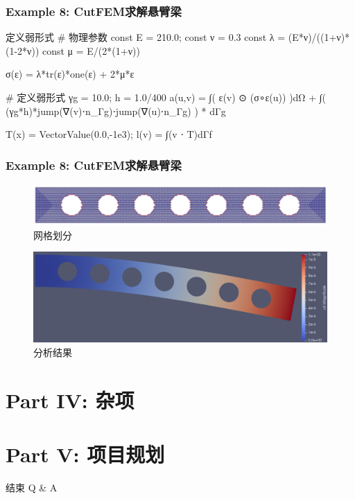 \documentclass[lang=en,aspectratio=43,theme=default,logo=on]{simplebeamer}
\begin{document}
\begin{frame}[fragile]
    \frametitle{Example 8: CutFEM求解悬臂梁}
\begin{codex}{15}{定义弱形式}
# 物理参数
const E = 210.0; const ν = 0.3
const λ = (E*ν)/((1+ν)*(1-2*ν))
const μ = E/(2*(1+ν))

σ(ε) = λ*tr(ε)*one(ε) + 2*μ*ε

# 定义弱形式
γg = 10.0; h = 1.0/400
a(u,v) = ∫( ε(v) ⊙ (σ∘ε(u)) )dΩ + ∫( (γg*h)*jump(∇(v)⋅n_Γg)⋅jump(∇(u)⋅n_Γg) ) * dΓg

T(x) = VectorValue(0.0,-1e3);
l(v) = ∫(v ⋅ T)dΓf
\end{codex}
\end{frame}

\begin{frame}[fragile]
    \frametitle{Example 8: CutFEM求解悬臂梁}
    \begin{figure}
        \centering %
        \includegraphics[width=1\textwidth]{./img/025.png}
        \caption{网格划分}
    \end{figure}
    \begin{figure}
        \centering %
        \includegraphics[width=1\textwidth]{./img/024.png}
        \caption{分析结果}
    \end{figure}
\end{frame}

\section{Part IV: 杂项}
\section{Part V: 项目规划}

\begin{frame}
    \centering
    \huge 结束 Q \& A
\end{frame}
\end{document}
